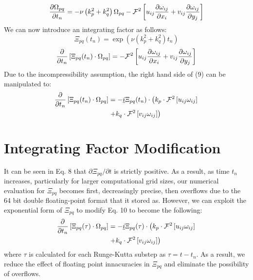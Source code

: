 \documentclass[10pt, reqno]{amsart}
\begin{document}
\begin{multicols}{2}
\begin{equation}
    \pdv{\Omega_{pq}}{t_n} = - \nu \left(k_p^2 + k_q^2 \right) \Omega_{pq} - \mathcal{F}^2 \left[ u_{ij} \pdv{\omega_{ij}}{x_i} + v_{ij} \pdv{\omega_{ij}}{y_j} \right]
\end{equation}
We can now introduce an integrating factor as follows:
\begin{equation}
    \Xi_{pq}(t_n) = \exp \left( \nu \left(k_p^2 + k_q^2 \right) t_n \right)
\end{equation}
\begin{equation}
    \pdv{}{t_n} \left[ \Xi_{pq} (t_n) \cdot \Omega_{pq} \right] = - \mathcal{F}^2 \left[ u_{ij} \pdv{\omega_{ij}}{x_i} + v_{ij} \pdv{\omega_{ij}}{y_j} \right]
\end{equation}
Due to the incompressibility assumption, the right hand side of (9) can be manipulated to:
\begin{equation}
    \begin{aligned}
    \pdv{}{t_n} \left[ \Xi_{pq} (t_n) \cdot \Omega_{pq} \right] &= - \underline{i} \Xi_{pq}(t_n) \cdot \left( k_p \cdot \mathcal{F}^2 \left[ u_{ij} \omega_{ij} \right] \right. \\
    & \left. + k_q \cdot \mathcal{F}^2 \left[ v_{ij} \omega_{ij} \right] \right)
    \end{aligned}
\end{equation}

\section*{Integrating Factor Modification}
It can be seen in Eq. 8 that $\partial \Xi_{pq} / \partial t$ is strictly positive. As a result, as time $t_n$ increases, particularly for larger computational grid sizes, our numerical evaluation for $\Xi_{pq}$ becomes first, decreasingly precise, then overflows due to the 64 bit double floating-point format that it stored as. However, we can exploit the exponential form of $\Xi_{pq}$ to modify Eq. 10 to become the following:
\begin{equation}
    \begin{aligned}
    \pdv{}{t_n} \left[ \Xi_{pq}(\tau) \cdot \Omega_{pq} \right] &= - \underline{i} \Xi_{pq}(\tau) \cdot \left( k_p \cdot \mathcal{F}^2 \left[ u_{ij} \omega_{ij} \right] \right. \\
    & \left. + k_q \cdot \mathcal{F}^2 \left[ v_{ij} \omega_{ij} \right] \right)
    \end{aligned}
\end{equation}
where $\tau$ is calculated for each Runge-Kutta substep as $\tau = t - t_n$. As a result, we reduce the effect of floating point innacuracies in $\Xi_{pq}$ and eliminate the possibility of overflows.


\end{multicols}
\end{document}

